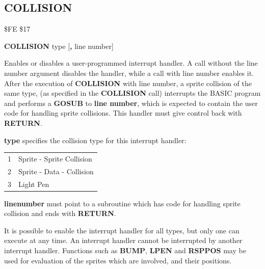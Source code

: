 \subsection{COLLISION}
\begin{description}[leftmargin=2cm,style=nextline]
\item [Token:] \$FE \$17
\item [Format:] {\bf COLLISION} type [{\bf,} line number]
\item [Usage:]  Enables or disables
                a user-programmed interrupt handler.
                A call without the line number argument disables the handler,
                while a call with line number enables it.
                After the execution of {\bf COLLISION} with
                line number, a sprite collision of the same type,
                (as specified in the {\bf COLLISION} call)
                interrupts the BASIC program and performs a {\bf GOSUB}
                to {\bf line number}, which is expected to contain
                the user code for handling sprite collisions.
                This handler must give control back with {\bf RETURN}.

                {\bf type} specifies the collision type for
                this interrupt handler:
                    \begin{center}
                    \begin{tabular}{|c | l|}
                    \hline
                    1	& 	Sprite - Sprite Collision \\
                    2	& 	Sprite - Data - Collision \\
                    3	& 	Light Pen \\
                    \hline
                    \end{tabular}
                    \end{center}

                {\bf linenumber} must point to a subroutine
                which has code for handling sprite collision
                and ends with {\bf RETURN}.

\item [Remarks:] It is possible to enable the interrupt handler for
               all types, but only one can execute at any time.
               An interrupt handler cannot be interrupted by another
               interrupt handler.
               Functions such as {\bf BUMP}, {\bf LPEN} and
               {\bf RSPPOS} may be used for evaluation of the sprites
               which are involved, and their positions.


\end{description}
